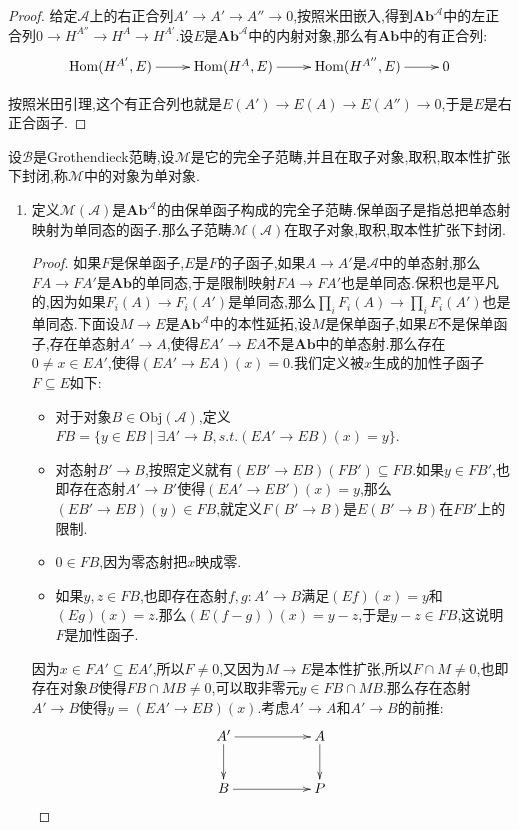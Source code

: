 \begin{enumerate}
\begin{proof}
    	给定$\mathscr{A}$上的右正合列$A'\to A'\to A''\to0$,按照米田嵌入,得到$\textbf{Ab}^{\mathscr{A}}$中的左正合列$0\to H^{A''}\to H^A\to H^{A'}$.设$E$是$\textbf{Ab}^{\mathscr{A}}$中的内射对象,那么有$\textbf{Ab}$中的有正合列:
    	$$\xymatrix{\mathrm{Hom}(H^{A'},E)\ar[r]&\mathrm{Hom}(H^A,E)\ar[r]&\mathrm{Hom}(H^{A''},E)\ar[r]&0}$$
    	
    	按照米田引理,这个有正合列也就是$E(A')\to E(A)\to E(A'')\to0$,于是$E$是右正合函子.
    \end{proof}
\end{enumerate}

设$\mathscr{B}$是Grothendieck范畴,设$\mathscr{M}$是它的完全子范畴,并且在取子对象,取积,取本性扩张下封闭,称$\mathscr{M}$中的对象为单对象.
\begin{enumerate}
	\item 定义$\mathscr{M}(\mathscr{A})$是$\textbf{Ab}^{\mathscr{A}}$的由保单函子构成的完全子范畴.保单函子是指总把单态射映射为单同态的函子.那么子范畴$\mathscr{M}(\mathscr{A})$在取子对象,取积,取本性扩张下封闭.
	\begin{proof}
		
		如果$F$是保单函子,$E$是$F$的子函子,如果$A\to A'$是$\mathscr{A}$中的单态射,那么$FA\to FA'$是$\textbf{Ab}$的单同态,于是限制映射$FA\to FA'$也是单同态.保积也是平凡的,因为如果$F_i(A)\to F_i(A')$是单同态,那么$\prod_iF_i(A)\to\prod_iF_i(A')$也是单同态.下面设$M\to E$是$\textbf{Ab}^{\mathscr{A}}$中的本性延拓,设$M$是保单函子,如果$E$不是保单函子,存在单态射$A'\to A$,使得$EA'\to EA$不是$\textbf{Ab}$中的单态射.那么存在$0\not=x\in EA'$,使得$(EA'\to EA)(x)=0$.我们定义被$x$生成的加性子函子$F\subseteq E$如下:
		\begin{itemize}
			\item 对于对象$B\in\mathrm{Obj}(\mathscr{A})$,定义$FB=\{y\in EB\mid\exists A'\to B,s.t. (EA'\to EB)(x)=y\}$.
			\item 对态射$B'\to B$,按照定义就有$(EB'\to EB)(FB')\subseteq FB$.如果$y\in FB'$,也即存在态射$A'\to B'$使得$(EA'\to EB')(x)=y$,那么$(EB'\to EB)(y)\in FB$,就定义$F(B'\to B)$是$E(B'\to B)$在$FB'$上的限制.
			\item $0\in FB$,因为零态射把$x$映成零.
			\item 如果$y,z\in FB$,也即存在态射$f,g:A'\to B$满足$(Ef)(x)=y$和$(Eg)(x)=z$.那么$(E(f-g))(x)=y-z$,于是$y-z\in FB$,这说明$F$是加性函子.
		\end{itemize}
		
		因为$x\in FA'\subseteq EA'$,所以$F\not=0$,又因为$M\to E$是本性扩张,所以$F\cap M\not=0$,也即存在对象$B$使得$FB\cap MB\not=0$,可以取非零元$y\in FB\cap MB$.那么存在态射$A'\to B$使得$y=(EA'\to EB)(x)$.考虑$A'\to A$和$A'\to B$的前推:
		$$\xymatrix{A'\ar[rr]\ar[d]&&A\ar[d]\\B\ar[rr]&&P}$$
		

\end{proof}
\end{enumerate}

